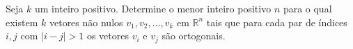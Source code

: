 Seja \(k\) um inteiro positivo. Determine o menor inteiro positivo \(n\) para o qual existem \(k\) vetores não nulos \(v_1,v_2,\ldots,v_k\) em \(\mathbb{R}^n\) tais que para cada par de índices \(i,j\) com \(|i-j|>1\) os vetores \(v_i\) e \(v_j\) são ortogonais.
